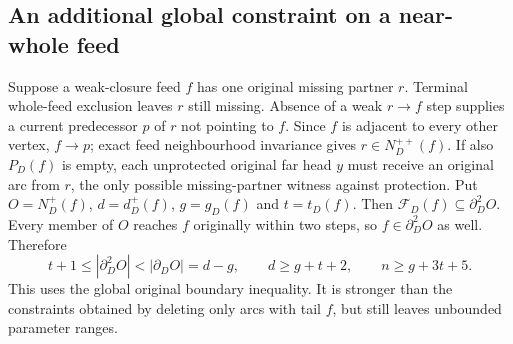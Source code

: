 \subsection{An additional global constraint on a near-whole feed}
Suppose a weak-closure feed $f$ has one original missing partner $r$.
Terminal whole-feed exclusion leaves $r$ still missing. Absence of a weak
$r\to f$ step supplies a current predecessor $p$ of $r$ not pointing to
$f$. Since $f$ is adjacent to every other vertex, $f\to p$; exact feed
neighbourhood invariance gives $r\in N_D^{++}(f)$.
If also $P_D(f)$ is empty, each unprotected original far head $y$ must
receive an original arc from $r$, the only possible missing-partner witness
against protection. Put $O=N_D^+(f)$, $d=d_D^+(f)$, $g=g_D(f)$ and $t=t_D(f)$.
Then $\mathcal F_D(f)\subseteq\partial_D^2O$. Every member of $O$ reaches
$f$ originally within two steps, so $f\in\partial_D^2O$ as well. Therefore
\[
 t+1\le|\partial_D^2O|<|\partial_D O|=d-g,
 \qquad d\ge g+t+2,\qquad n\ge g+3t+5.
\]
This uses the global original boundary inequality. It is stronger than
the constraints obtained by deleting only arcs with tail $f$, but still
leaves unbounded parameter ranges.
